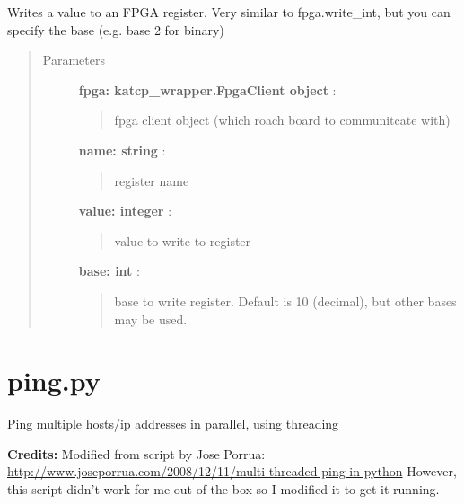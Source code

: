 \documentclass[letterpaper,10pt,english]{sphinxmanual}
\begin{document}
\begin{fulllineitems}
\label{index:roachnest_helpers.writereg}
Writes a value to an FPGA register. 
Very similar to fpga.write\_int, but you can specify the base (e.g. base 2 for binary)
\begin{quote}\begin{description}
\item[{Parameters }] \leavevmode
\textbf{fpga: katcp\_wrapper.FpgaClient object} :
\begin{quote}

fpga client object (which roach board to communitcate with)
\end{quote}

\textbf{name: string} :
\begin{quote}

register name
\end{quote}

\textbf{value: integer} :
\begin{quote}

value to write to register
\end{quote}

\textbf{base: int} :
\begin{quote}

base to write register. Default is 10 (decimal), but other bases may be used.
\end{quote}

\end{description}\end{quote}

\end{fulllineitems}

\label{index:module-ping}

\section{ping.py}
\label{index:ping-py}
Ping multiple hosts/ip addresses in parallel, using threading

\textbf{Credits:} Modified from script by Jose Porrua:
\href{http://www.joseporrua.com/2008/12/11/multi-threaded-ping-in-python}{http://www.joseporrua.com/2008/12/11/multi-threaded-ping-in-python}
However, this script didn't work for me out of the box so I modified it to get it running.

\end{document}
